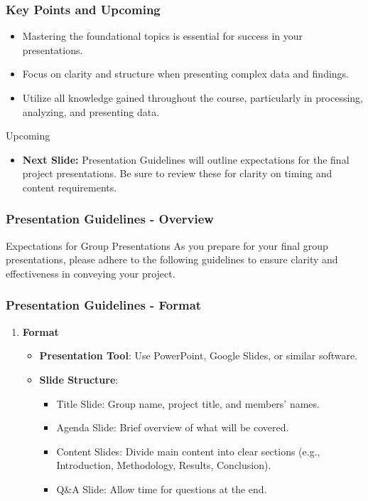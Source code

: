 \documentclass[aspectratio=169]{beamer}
\begin{document}
\begin{frame}[fragile]
    \frametitle{Key Points and Upcoming}
    \begin{itemize}
        \item Mastering the foundational topics is essential for success in your presentations.
        \item Focus on clarity and structure when presenting complex data and findings.
        \item Utilize all knowledge gained throughout the course, particularly in processing, analyzing, and presenting data.
    \end{itemize}
    \begin{block}{Upcoming}
        \begin{itemize}
            \item \textbf{Next Slide:} Presentation Guidelines will outline expectations for the final project presentations. Be sure to review these for clarity on timing and content requirements.
        \end{itemize}
    \end{block}
\end{frame}

\begin{frame}[fragile]
    \frametitle{Presentation Guidelines - Overview}
    \begin{block}{Expectations for Group Presentations}
        As you prepare for your final group presentations, please adhere to the following guidelines to ensure clarity and effectiveness in conveying your project.
    \end{block}
\end{frame}

\begin{frame}[fragile]
    \frametitle{Presentation Guidelines - Format}
    \begin{enumerate}
        \item \textbf{Format}
        \begin{itemize}
            \item \textbf{Presentation Tool}: Use PowerPoint, Google Slides, or similar software.
            \item \textbf{Slide Structure}:
            \begin{itemize}
                \item Title Slide: Group name, project title, and members' names.
                \item Agenda Slide: Brief overview of what will be covered.
                \item Content Slides: Divide main content into clear sections (e.g., Introduction, Methodology, Results, Conclusion).
                \item Q\&A Slide: Allow time for questions at the end.
            \end{itemize}
        \end{itemize}
    \end{enumerate}
\end{frame}
\end{document}
